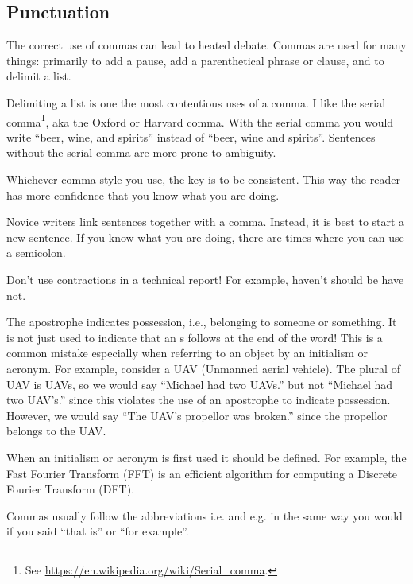 \documentclass[a4paper,12pt]{article}
\newcounter{foo}
\newcounter{bar}
\begin{document}
\subsection{Punctuation}
\label{sec:punctuation}

The correct use of commas can lead to heated debate.  Commas are used
for many things: primarily to add a pause, add a parenthetical phrase
or clause, and to delimit a list.

Delimiting a list is one the most contentious uses of a comma.  I like
the serial comma\footnote{See
  \url{https://en.wikipedia.org/wiki/Serial_comma}.}, aka the Oxford
or Harvard comma.  With the serial comma you would write ``beer, wine,
and spirits'' instead of ``beer, wine and spirits''.  Sentences
without the serial comma are more prone to ambiguity.

\begin{list}{W-}{}
\setcounter{foo}{\value{bar}}

\item Whichever comma style you use, the key is to be consistent.
  This way the reader has more confidence that you know what you are
  doing.

\item Novice writers link sentences together with a comma.  Instead,
  it is best to start a new sentence.  If you know what you are doing,
  there are times where you can use a semicolon.

\item Don't use contractions in a technical report!  For example,
  haven't should be have not.

\item The apostrophe indicates possession, i.e., belonging to someone
  or something.  It is not just used to indicate that an s follows at
  the end of the word!  This is a common mistake especially when
  referring to an object by an initialism or acronym.  For example,
  consider a UAV (Unmanned aerial vehicle).  The plural of UAV is
  UAVs, so we would say ``Michael had two UAVs.'' but not ``Michael had
  two UAV's.'' since this violates the use of an apostrophe to indicate
  possession.  However, we would say ``The UAV's propellor was broken.''
  since the propellor belongs to the UAV.

\item When an initialism or acronym is first used it should be
  defined.  For example, the Fast Fourier Transform (FFT) is an
  efficient algorithm for computing a Discrete Fourier Transform
  (DFT).

\item Commas usually follow the abbreviations i.e. and e.g. in the same
  way you would if you said ``that is'' or ``for example''.  

\setcounter{bar}{\value{foo}}
\end{list}
\end{document}
